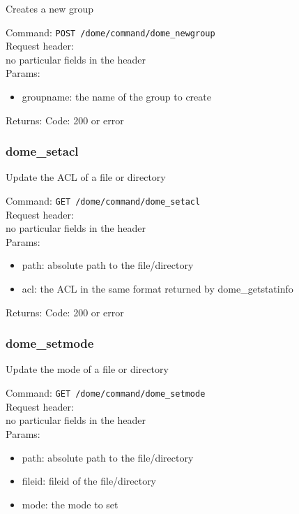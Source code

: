 \documentclass[a4paper,10pt]{scrreprt}
\begin{document}
Creates a new group

Command:
\lstinline"POST /dome/command/dome_newgroup"\\

Request header:\\
no particular fields in the header\\

Params:
\begin{itemize}
 \item groupname: the name of the group to create
\end{itemize}

Returns:
Code: 200 or error



\subsubsection{dome\_setacl}

Update the ACL of a file or directory

Command:
\lstinline"GET /dome/command/dome_setacl"\\

Request header:\\
no particular fields in the header\\

Params:
\begin{itemize}
  \item path: absolute path to the file/directory
  \item acl: the ACL in the same format returned by dome\_getstatinfo
\end{itemize}

Returns:
Code: 200 or error



\subsubsection{dome\_setmode}

Update the mode of a file or directory

Command:
\lstinline"GET /dome/command/dome_setmode"\\

Request header:\\
no particular fields in the header\\

Params:
\begin{itemize}
  \item path: absolute path to the file/directory
  \item fileid: fileid of the file/directory
  \item mode: the mode to set
\end{itemize}
\end{document}
